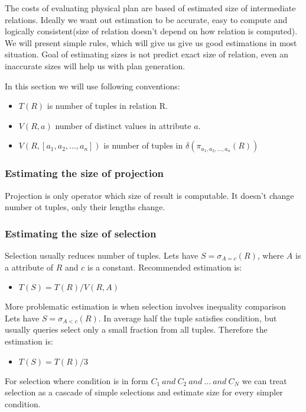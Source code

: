 The costs of evaluating physical plan are based of estimated size of interme\-dia\-te relations. Ideally we want out estimation to be accurate, easy to compute and logically consistent(size of relation doesn't depend on how relation is computed). We will present simple rules, which will give us give us good estimations in most situation. Goal of estimating sizes is not predict exact size of relation, even an inaccurate sizes will help us with plan generation.

In this section we will use following conventions:

\begin{itemize}
\item $T(R)$ is number of tuples in relation R.
\item $V(R,a)$ number of distinct values in attribute $a$. 
\item $V(R,[a_1,a_2,...,a_n])$ is number of tuples in $\delta(\pi_{a_1,a_2,...,a_n}(R))$
\end{itemize}

\subsubsection{Estimating the size of projection}

Projection is only operator which size of result is computable. It doesn't change number ot tuples, only their lengths change.

\subsubsection{Estimating the size of selection}

Selection usually reduces number of tuples. Lets have $S=\sigma_{A=c}(R)$, where $A$ is a attribute of $R$ and $c$ is a constant. Recommended estimation is:
\begin{itemize}
\item $T(S)=T(R)/V(R,A)$
\end{itemize}

More problematic estimation is when selection involves inequality comparison Lets have $S=\sigma_{A<c}(R)$. In average half the tuple satisfies condition, but usually queries select only a small fraction from all tuples. Therefore the estimation is:
\begin{itemize}
\item $T(S)=T(R)/3$
\end{itemize}

For selection where condition is in form $C_1~and~C_2~and~...~and~C_N$ we can treat selection as a cascade of simple selections and estimate size for every simpler condition.

